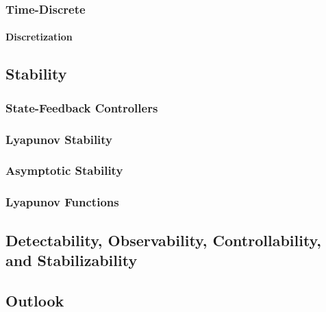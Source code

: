             \subsubsection{Time-Discrete} %

                \paragraph{Discretization} %

        \subsection{Stability} %

            \subsubsection{State-Feedback Controllers} %

            \subsubsection{Lyapunov Stability} %

            \subsubsection{Asymptotic Stability} %

            \subsubsection{Lyapunov Functions} %

        \subsection{Detectability, Observability, Controllability, and Stabilizability} %

        \subsection{Outlook} %

